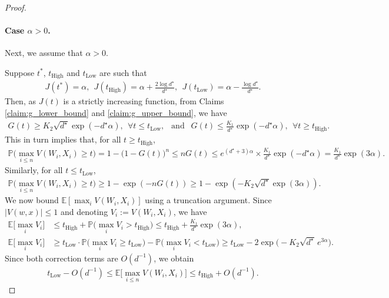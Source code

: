\documentclass[12pt]{article}
\theoremstyle{definition}
\theoremstyle{remark}
\begin{document}
\begin{proof}
{\paragraph{Case $\alpha > 0$.} Next, we assume that $\alpha >0$. } Suppose $t^*$, $t_{\text{High}}$ and $t_{\text{Low}}$ are such that
\begin{align*}
    J(t^*) = \alpha, \ \ J(t_{\text{High}}) = \alpha + \frac{2\log d^\star}{d^\star}, \ \ J(t_{\text{Low}}) = \alpha - \frac{\log d^\star}{d^\star}.
\end{align*}
Then, as $J(t)$ is a strictly increasing function, from Claims \ref{claim:g_lower_bound} and \ref{claim:g_upper_bound}, we have
\begin{align*}
    G(t) \geq K_2 \sqrt{d^\star} \exp\left( - d^\star \alpha \right), \ \ \forall t \leq t_{\text{Low}}, \ \ \text{ and } \ \ G(t) \leq \frac{K_1}{d^\star} \exp\left( - d^\star \alpha \right), \ \ \forall t \geq t_{\text{High}}.
\end{align*}
This in turn implies that, for all $t \geq t_{\text{High}}$,
\begin{align*}
    \mathbb{P}\Big( \max_{i\leq n} V(W_i,X_i) \geq t\Big) = 1-\big(1-G(t)\big)^n \leq n G(t) \leq e^{(d^\star+3) \alpha} \times \frac{K_1}{d^\star} \exp\left( - d^\star \alpha \right) = \frac{K_1}{d^\star}\exp(3\alpha).
\end{align*}
Similarly, for all $t \leq t_{\text{Low}}$,
\begin{align*}
    \mathbb{P}\Big( \max_{i\leq n} V(W_i,X_i) \geq t\Big) \geq 1- \exp\left(- n G(t)\right) \geq 1- \exp\left(- K_2 \sqrt{d^\star}\exp(3\alpha)\right).
\end{align*}
We now bound $\mathbb{E}[\max_i V(W_i,X_i)]$ using a truncation argument. Since $|V(w,x)| \leq 1$ and denoting $V_i := V(W_i,X_i)$, we have
\begin{align*}
    \mathbb{E}\Big[\max_i V_i\Big] &\leq t_{\text{High}} + \mathbb{P}\Big(\max_i V_i > t_{\text{High}}\Big) \leq t_{\text{High}} + \frac{K_1}{d^\star}\exp(3\alpha),\\
    \mathbb{E}\Big[\max_i V_i\Big] &\geq t_{\text{Low}} \cdot \mathbb{P}\Big(\max_i V_i \geq t_{\text{Low}}\Big) - \mathbb{P}\Big(\max_i V_i < t_{\text{Low}}\Big) \geq t_{\text{Low}} - 2\exp\big(-K_2 \sqrt{d^\star}\, e^{3\alpha}\big).
\end{align*}
Since both correction terms are $O(d^{-1})$, we obtain
\begin{align*}
    t_{\text{Low}} - O(d^{-1}) \leq \mathbb{E} \Big[\max_{i\leq n} V(W_i,X_i)\Big] \leq t_{\text{High}} + O(d^{-1}).

\end{align*}
\end{proof}
\end{document}
